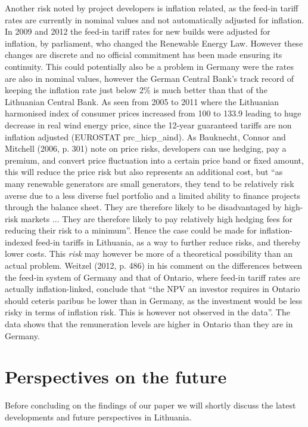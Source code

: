 \documentclass[a4paper, 12pt]{article}
\begin{document}
Another risk noted by project developers is inflation related, as the feed-in tariff rates are currently in nominal values and not automatically adjusted for inflation. In 2009 and 2012 the feed-in tariff rates for new builds were adjusted for inflation, by parliament, who changed the Renewable Energy Law. However these changes are discrete and no official commitment has been made ensuring its continuity. This could potentially also be a problem in Germany were the rates are also in nominal values, however the German Central Bank’s track record of keeping the inflation rate just below 2\% is much better than that of the Lithuanian Central Bank. As seen from 2005 to 2011 where the Lithuanian harmonised index of consumer prices increased from 100 to 133.9 leading to huge decrease in real wind energy price, since the 12-year guaranteed tariffs are non inflation adjusted (EUROSTAT prc\_hicp\_aind). As Bauknecht, Connor and Mitchell (2006, p. 301) note on price risks, developers can use hedging, pay a premium, and convert price fluctuation into a certain price band or fixed amount, this will reduce the price risk but also represents an additional cost, but ``as many renewable generators are small generators, they tend to be relatively risk averse due to a less diverse fuel portfolio and a limited ability to finance projects through the balance sheet. They are therefore likely to be disadvantaged by high-risk markets ... They are therefore likely to pay relatively high hedging fees for reducing their risk to a minimum''. Hence the case could be made for inflation-indexed feed-in tariffs in Lithuania, as a way to further reduce risks, and thereby lower costs. This \emph{risk} may however be more of a theoretical possibility than an actual problem. Weitzel (2012, p. 486) in his comment on the differences between the feed-in system of Germany and that of Ontario, where feed-in tariff rates are actually inflation-linked, conclude that ``the NPV an investor requires in Ontario should ceteris paribus be lower than in Germany, as the investment would be less risky in terms of inflation risk. This is however not observed in the data''. The data shows that the remuneration levels are higher in Ontario than they are in Germany.

\section{Perspectives on the future}
Before concluding on the findings of our paper we will shortly discuss the latest developments and future perspectives in Lithuania.
\end{document}
